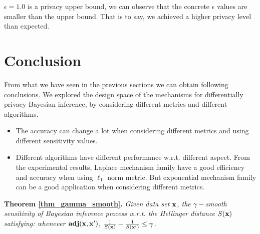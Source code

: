 \documentclass{article}
\begin{document}
$\epsilon = 1.0$ is a privacy upper bound, we can observe that the concrete $\epsilon$ values are smaller than the upper bound. That is to say, we achieved a higher privacy level than expected. 


\section{Conclusion}
From what we have seen in the previous sections we can obtain following conclusions. We explored the design space of the mechanisms for differentially privacy Bayesian inference, by considering different metrics and different algorithms.
\begin{itemize}
  \item The accuracy can change a lot when considering different metrics and using different sensitivity values.
  \item Different algorithms have different performance w.r.t. different aspect. From the experimental results, Laplace mechanism family have a good efficiency and accuracy when using $\ell_1$ norm metric. But exponential mechanism family can be a good application when considering different metrics.
\end{itemize}






\appendix

\noindent \textbf{Theorem \ref{thm_gamma_smooth}.}
\emph{
Given data set $\textbf{x}$, the $\gamma -$smooth sensitivity of Bayesian inference process w.r.t. the Hellinger distance $S(\textbf{x})$ satisfying:%
whenever $\textbf{adj}(\textbf{x},\textbf{x}')$, 
$\frac{1}{S(\textbf{x})} - \frac{1}{S(\textbf{x}')} \leq \gamma$.
}
\end{document}
